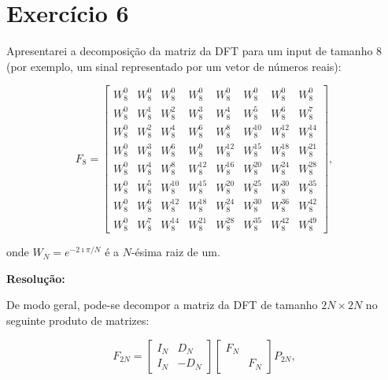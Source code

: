
\section*{\large Exercício 6}
%

Apresentarei a decomposição da matriz da DFT para um input de tamanho 8 (por exemplo, um sinal representado por um vetor de números reais):

\begin{equation*}
F_{8} = 
\begin{bmatrix}
W_{8}^{0} & W_{8}^{0} & W_{8}^{0} & W_{8}^{0} & W_{8}^{0} & W_{8}^{0} & W_{8}^{0} & W_{8}^{0} \\
W_{8}^{0} & W_{8}^{1} & W_{8}^{2} & W_{8}^{3} & W_{8}^{4} & W_{8}^{5} & W_{8}^{6} & W_{8}^{7} \\
W_{8}^{0} & W_{8}^{2} & W_{8}^{4} & W_{8}^{6} & W_{8}^{8} & W_{8}^{10} & W_{8}^{12} & W_{8}^{14} \\
W_{8}^{0} & W_{8}^{3} & W_{8}^{6} & W_{8}^{9} & W_{8}^{12} & W_{8}^{15} & W_{8}^{18} & W_{8}^{21} \\
W_{8}^{0} & W_{8}^{4} & W_{8}^{8} & W_{8}^{12} & W_{8}^{16} & W_{8}^{20} & W_{8}^{24} & W_{8}^{28} \\
W_{8}^{0} & W_{8}^{5} & W_{8}^{10} & W_{8}^{15} & W_{8}^{20} & W_{8}^{25} & W_{8}^{30} & W_{8}^{35} \\
W_{8}^{0} & W_{8}^{6} & W_{8}^{12} & W_{8}^{18} & W_{8}^{24} & W_{8}^{30} & W_{8}^{36} & W_{8}^{42} \\
W_{8}^{0} & W_{8}^{7} & W_{8}^{14} & W_{8}^{21} & W_{8}^{28} & W_{8}^{35} & W_{8}^{42} & W_{8}^{49}
\end{bmatrix},
\end{equation*}

onde $W_{N}=e^{-2\imath \pi /N}$ é a $N$-ésima raiz de um.


\textbf{Resolução:}

De modo geral, pode-se decompor a matriz da DFT de tamanho $2N \times 2N$ no seguinte produto de matrizes:

\begin{equation*}
F_{2N} = 
\begin{bmatrix}
I_{N} & D_{N}\\
I_{N} & -D_{N} 
\end{bmatrix}
\begin{bmatrix}
F_{N} & \\
 & F_{N} 
\end{bmatrix}
P_{2N},
\end{equation*}

